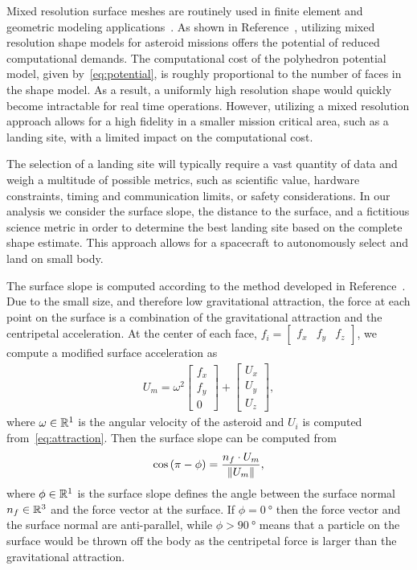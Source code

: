 \documentclass[journal]{new-aiaa}
\begin{document}
Mixed resolution surface meshes are routinely used in finite element and geometric modeling applications~\cite{botsch2010}.
As shown in Reference~, utilizing mixed resolution shape models for asteroid missions offers the potential of reduced computational demands.
The computational cost of the polyhedron potential model, given by~\cref{eq:potential}, is roughly proportional to the number of faces in the shape model.
As a result, a uniformly high resolution shape would quickly become intractable for real time operations.
However, utilizing a mixed resolution approach allows for a high fidelity in a smaller mission critical area, such as a landing site, with a limited impact on the computational cost.

The selection of a landing site will typically require a vast quantity of data and weigh a multitude of possible metrics, such as scientific value, hardware constraints, timing and communication limits, or safety considerations. 
In our analysis we consider the surface slope, the distance to the surface, and a fictitious science metric in order to determine the best landing site based on the complete shape estimate.
This approach allows for a spacecraft to autonomously select and land on small body.

The surface slope is computed according to the method developed in Reference~\cite{scheeres1996}.
Due to the small size, and therefore low gravitational attraction, the force at each point on the surface is a combination of the gravitational attraction and the centripetal acceleration.
At the center of each face, \( f_i = \begin{bmatrix} f_x & f_y & f_z \end{bmatrix} \), we compute a modified surface acceleration as
\begin{align}\label{eq:surface_force}
    U_m = \omega^2 \begin{bmatrix} f_x \\ f_y \\ 0 \end{bmatrix} + \begin{bmatrix} U_x \\ U_y \\ U_z \end{bmatrix},
\end{align}
where \( \omega \in \mathbb{R}^1 \) is the angular velocity of the asteroid and \( U_i \) is computed from~\cref{eq:attraction}.
Then the surface slope can be computed from
\begin{align}\label{eq:surface_slope}
    \cos \left(  \pi - \phi  \right) = \frac{n_f \cdot U_m}{\left\| U_m \right\|},
\end{align}
where \( \phi \in \mathbb{R}^1 \) is the surface slope defines the angle between the surface normal \( n_f \in \mathbb{R}^3 \) and the force vector at the surface.
If \( \phi = \SI{0}{\degree} \) then the force vector and the surface normal are anti-parallel, while \( \phi > \SI{90}{\degree} \) means that a particle on the surface would be thrown off the body as the centripetal force is larger than the gravitational attraction.
\end{document}
